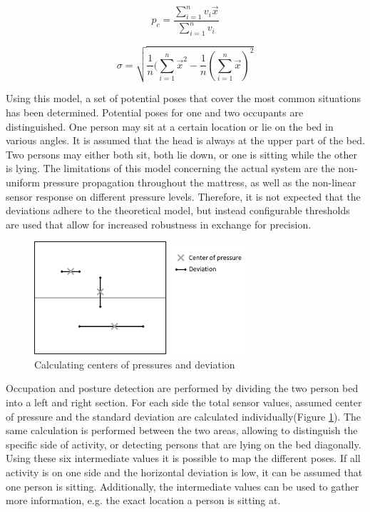 \begin{equation}
p_c=\frac{\sum_{i=1}^n{v_i\overrightarrow{x}}}{\sum_{i=1}^n{v_i}}
\end{equation}

\begin{equation}
\sigma=\sqrt{\frac{1}{n}(\sum_{i=1}^n{\overrightarrow{x}^2}-\frac{1}{n}(\sum_{i=1}^n{\overrightarrow{x}})^2}
\end{equation}

Using this model, a set of potential poses that cover the most common situations has been determined. Potential poses for one and two occupants are distinguished. One person may sit at a certain location or lie on the bed in various angles. It is assumed that the head is always at the upper part of the bed. Two persons may either both sit, both lie down, or one is sitting while the other is lying. 
The limitations of this model concerning the actual system are the non-uniform pressure propagation throughout the mattress, as well as the non-linear sensor response on different pressure levels. Therefore, it is not expected that the deviations adhere to the theoretical model, but instead configurable thresholds are used that allow for increased robustness in exchange for precision.

\begin{figure}[ht]
\centering
\includegraphics[width=0.7\textwidth]{images/smartbed_cog}
\caption{Calculating centers of pressures and deviation \cite{braun2012context}}
\label{fig:smartbed_cog}
\end{figure}

Occupation and posture detection are performed by dividing the two person bed into a left and right section. For each side the total sensor values, assumed center of pressure  and the standard deviation are calculated individually(Figure \ref{fig:smartbed_cog}). The same calculation is performed between the two areas, allowing to distinguish the specific side of activity, or detecting persons that are lying on the bed diagonally.
Using these six intermediate values it is possible to map the different poses. If all activity is on one side and the horizontal deviation is low, it can be assumed that one person is sitting. Additionally, the intermediate values can be used to gather more information, e.g. the exact location a person is sitting at. 

